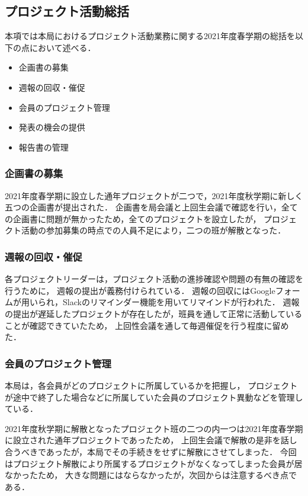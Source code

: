 \subsection*{プロジェクト活動総括}



本項では本局におけるプロジェクト活動業務に関する2021年度春学期の総括を以下の点において述べる．

\begin{itemize}
  \item 企画書の募集
  \item 週報の回収・催促
  \item 会員のプロジェクト管理
  \item 発表の機会の提供
  \item 報告書の管理
\end{itemize}

\subsubsection*{企画書の募集}

2021年度春学期に設立した通年プロジェクトが二つで，2021年度秋学期に新しく五つの企画書が提出された．
企画書を局会議と上回生会議で確認を行い，全ての企画書に問題が無かったため，全てのプロジェクトを設立したが，
プロジェクト活動の参加募集の時点での人員不足により，二つの班が解散となった．

\subsubsection*{週報の回収・催促}

各プロジェクトリーダーは，プロジェクト活動の進捗確認や問題の有無の確認を行うために，
週報の提出が義務付けられている．
週報の回収にはGoogleフォームが用いられ，Slackのリマインダー機能を用いてリマインドが行われた．
週報の提出が遅延したプロジェクトが存在したが，班員を通して正常に活動していることが確認できていたため，
上回性会議を通して毎週催促を行う程度に留めた．

\subsubsection*{会員のプロジェクト管理}

本局は，各会員がどのプロジェクトに所属しているかを把握し，
プロジェクトが途中で終了した場合などに所属していた会員のプロジェクト異動などを管理している．

2021年度秋学期に解散となったプロジェクト班の二つの内一つは2021年度春学期に設立された通年プロジェクトであったため，
上回生会議で解散の是非を話し合うべきであったが，本局でその手続きをせずに解散にさせてしまった．
今回はプロジェクト解散により所属するプロジェクトがなくなってしまった会員が居なかったため，
大きな問題にはならなかったが，次回からは注意するべき点である．


